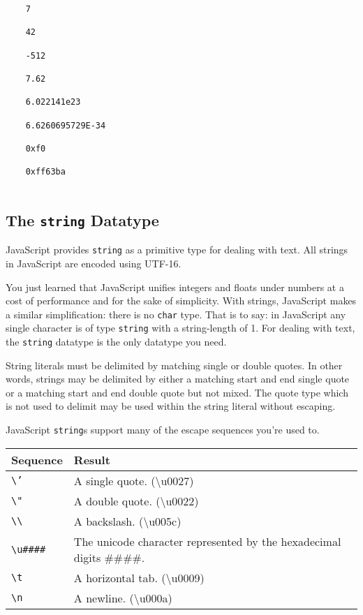 \documentclass[11pt,letter]{book}
\begin{document}
    \begin{verbatim}
    7
    
    42
    
    -512
    
    7.62
    
    6.022141e23
    
    6.6260695729E-34
    
    0xf0
    
    0xff63ba
    
    \end{verbatim}
    
    \subsection{The \texttt{string} Datatype}
    JavaScript provides \texttt{string} as a primitive type for dealing with text. All strings in 
    JavaScript are encoded using UTF-16.
    
    You just learned that JavaScript unifies integers and floats under numbers at a cost of 
    performance and for the sake of simplicity. With strings, JavaScript makes a similar 
    simplification: there is no \texttt{char} type. That is to say: in JavaScript any single 
    character is of type \texttt{string} with a string-length of 1. For dealing with  
    text, the \texttt{string} datatype is the only datatype you need.
    
    String literals must be delimited by matching single or double quotes. In other words, strings 
    may be delimited by either a matching start and end single quote or a matching start and end 
    double quote but not mixed. The quote type which is not used to delimit may be used within the 
    string literal without escaping.
    
    JavaScript \texttt{string}s support many of the escape sequences you're used to.
    
    \vspace{10pt}
    \begin{tabular}{l|l}
        Sequence & Result \\
        \hline
        \texttt{\textbackslash{'}}  & A single quote. (\textbackslash{u0027}) \\
        \texttt{\textbackslash{"}}  & A double quote. (\textbackslash{u0022}) \\
        \texttt{\textbackslash\textbackslash} 
                                    & A backslash. (\textbackslash{u005c}) \\
        \texttt{\textbackslash{u\#\#\#\#}}
                                    & The unicode character represented by the hexadecimal
                                        digits \#\#\#\#. \\
        \texttt{\textbackslash{t}}  & A horizontal tab. (\textbackslash{u0009}) \\
        \texttt{\textbackslash{n}}  & A newline. (\textbackslash{u000a}) \\
    \end{tabular}
    \vspace{10pt}
    
\end{document}
